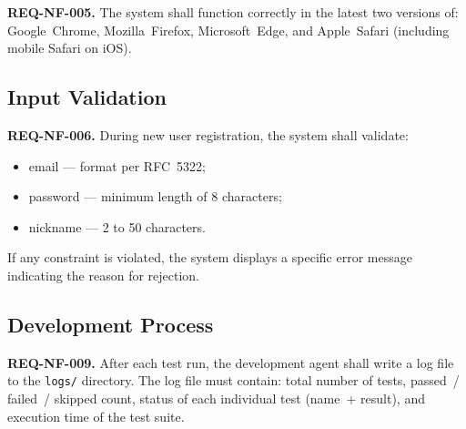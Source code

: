 \textbf{REQ-NF-005.} The system shall function correctly in the latest two versions of: Google~Chrome, Mozilla~Firefox, Microsoft~Edge, and Apple~Safari (including mobile Safari on iOS). 

\subsection{Input Validation}

\textbf{REQ-NF-006.} During new user registration, the system shall validate:
\begin{itemize}
  \item email --- format per RFC~5322;
  \item password --- minimum length of 8 characters;
  \item nickname --- 2 to 50 characters.
\end{itemize}
If any constraint is violated, the system displays a specific error message indicating the reason for rejection. 

\subsection{Development Process}

\textbf{REQ-NF-009.} After each test run, the development agent shall write a log file to the \texttt{logs/} directory. The log file must contain: total number of tests, passed~/ failed~/ skipped count, status of each individual test (name~+ result), and execution time of the test suite. 
